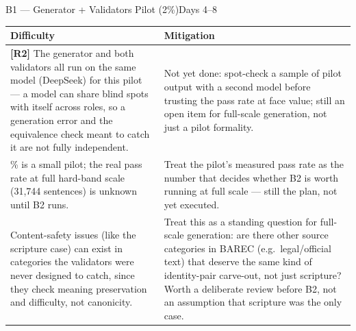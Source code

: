 \documentclass[11pt,a4paper]{article}
\begin{document}
\begin{milestonehead}{B1 --- Generator + Validators Pilot (2\%)}{Days 4--8}
\begin{center}
\small
\begin{tabular}{@{}p{6.3cm}p{6.9cm}@{}}
\toprule
\textbf{Difficulty} & \textbf{Mitigation} \\
\midrule
\textbf{[R2]} The generator and both validators all run on the same model
(DeepSeek) for this pilot --- a model can share blind spots with itself
across roles, so a generation error and the equivalence check meant to
catch it are not fully independent. & Not yet done: spot-check a sample of
pilot output with a second model before trusting the pass rate at face
value; still an open item for full-scale generation, not just a pilot
formality. \\
\addlinespace
2\% is a small pilot; the real pass rate at full hard-band scale (31,744
sentences) is unknown until B2 runs. & Treat the pilot's measured pass rate
as the number that decides whether B2 is worth running at full scale ---
still the plan, not yet executed. \\
\addlinespace
Content-safety issues (like the scripture case) can exist in categories the
validators were never designed to catch, since they check meaning
preservation and difficulty, not canonicity. & Treat this as a standing
question for full-scale generation: are there other source categories in
BAREC (e.g.\ legal/official text) that deserve the same kind of
identity-pair carve-out, not just scripture? Worth a deliberate review
before B2, not an assumption that scripture was the only case. \\
\bottomrule
\end{tabular}
\end{center}
\end{milestonehead}
\end{document}
